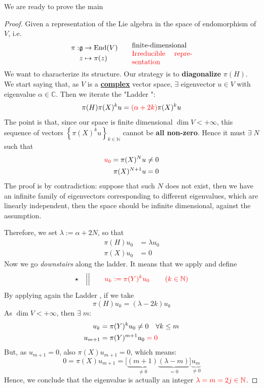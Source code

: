\documentclass[../main.tex]{subfiles}
\begin{document}
We are ready to prove the main 
\begin{proof}
Given a representation of the Lie algebra in the space of endomorphism of $V$, i.e. 
\[
\begin{split}
    \pi:&\mathfrak{g}\to\textrm{End}(V)\\
    &z\mapsto \pi(z)
\end{split}
\qquad \text{\parbox{3cm}{finite-dimensional\\{\color{red}Irreducible representation}}}
\]
We want to characterize its structure. Our strategy is to \textbf{diagonalize} {\color{red}$\pi(H)$}. We start saying that, as $V$ is a \textbf{\underline{complex}} vector space, $\exists$ eigenvector $u\in V$ with eigenvalue $\alpha\in\mathbb{C}$. Then we iterate the "Ladder ":
\[
\pi(H)\pi(X)^ku={\color{red}\left(\alpha+2k\right)}\pi(X)^ku
\]
The point is that, since our space is finite dimensional {\color{red}$\dim V<+\infty$}, this sequence of vectors $\left\{\pi(X)^ku\right\}_{k\in\mathbb{N}}$ cannot be \textbf{all non-zero}. Hence it must $\exists\;N$ such that
\[
\begin{split}
    {\color{red}u_0}=\pi(X)^Nu&\neq 0\\
    \pi(X)^{N+1}u&=0
\end{split}
\]
The proof is by contradiction: suppose that such $N$ does not exist, then we have an infinite family of eigenvectors corresponding to different eigenvalues, which are linearly independent, then the space should be infinite dimensional, against the assumption.

Therefore, we set $\lambda:=\alpha+2N$, so that
\[
\begin{split}
    \pi(H)u_0&=\lambda u_0\\
    \pi(X)u_0&=0
\end{split}
\]
Now we go \textit{downstairs} along the ladder. It means that we apply and define
\[
{\star\quad \Big|\Big| \qquad \color{red}u_k:=\pi(Y)^ku_0\qquad \left(k\in\mathbb{N}\right)} 
\]
By applying again the Ladder , if we take
\[
\pi(H)u_k=\left(\lambda-2k\right)u_k
\]
As {\color{red}$\dim V<+\infty$}, then $\exists\;m:$
\[
\begin{split}
u_k&=\pi(Y)^ku_0\neq 0 \quad \forall k\leq m\\
u_{m+1}&=\pi(Y)^{m+1}u_0{\color{red}\;=0}
\end{split}
\]
But, as $u_{m+1}=0$, also $\pi(X)u_{m+1}=0$, which means:
\[
0=\pi(X)u_{m+1}=\big[\underbrace{(m+1)}_{\neq 0}\underbrace{(\lambda-m)}_{=0}\big]\underbrace{u_m}_{\neq 0}
\]
Hence, we conclude that the eigenvalue is actually an integer ${\color{red}\lambda=m=2j\in\mathbb{N}}$.


\end{proof}
\end{document}
